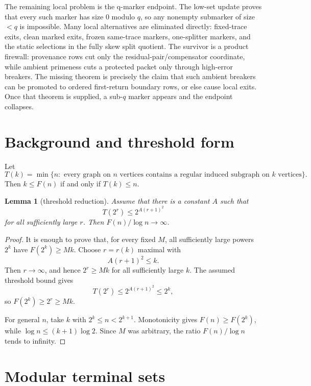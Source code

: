 \documentclass[11pt]{article}
\newtheorem{lemma}[theorem]{Lemma}
\theoremstyle{remark}
\begin{document}
The remaining local problem is the q-marker endpoint.  The low-set update
proves that every such marker has size \(0\) modulo \(q\), so any nonempty
submarker of size \(<q\) is impossible.  Many local alternatives are eliminated
directly: fixed-trace exits, clean marked exits, frozen same-trace markers,
one-splitter markers, and the static selections in the fully skew split
quotient.  The survivor is a product firewall: provenance rows cut only the
residual-pair/compensator coordinate, while ambient primeness cuts a protected
packet only through high-error breakers.  The missing theorem is precisely the
claim that such ambient breakers can be promoted to ordered first-return
boundary rows, or else cause local exits.  Once that theorem is supplied, a
sub-\(q\) marker appears and the endpoint collapses.

\section{Background and threshold form}

Let
\[
  T(k)=\min\{n:\text{ every graph on }n\text{ vertices contains a regular
  induced subgraph on }k\text{ vertices}\}.
\]
Then \(k\le F(n)\) if and only if \(T(k)\le n\).

\begin{lemma}[threshold reduction]\label{lem:threshold}
Assume that there is a constant \(A\) such that
\[
  T(2^r)\le 2^{A(r+1)^2}
\]
for all sufficiently large \(r\).  Then \(F(n)/\log n\to\infty\).
\end{lemma}

\begin{proof}
It is enough to prove that, for every fixed \(M\), all sufficiently large powers
\(2^k\) have \(F(2^k)\ge Mk\).  Choose \(r=r(k)\) maximal with
\[
  A(r+1)^2\le k.
\]
Then \(r\to\infty\), and hence \(2^r\ge Mk\) for all sufficiently large \(k\).
The assumed threshold bound gives
\[
  T(2^r)\le 2^{A(r+1)^2}\le 2^k,
\]
so \(F(2^k)\ge 2^r\ge Mk\).

For general \(n\), take \(k\) with \(2^k\le n<2^{k+1}\).  Monotonicity gives
\(F(n)\ge F(2^k)\), while \(\log n\le (k+1)\log 2\).  Since \(M\) was
arbitrary, the ratio \(F(n)/\log n\) tends to infinity.
\end{proof}

\section{Modular terminal sets}
\end{document}
